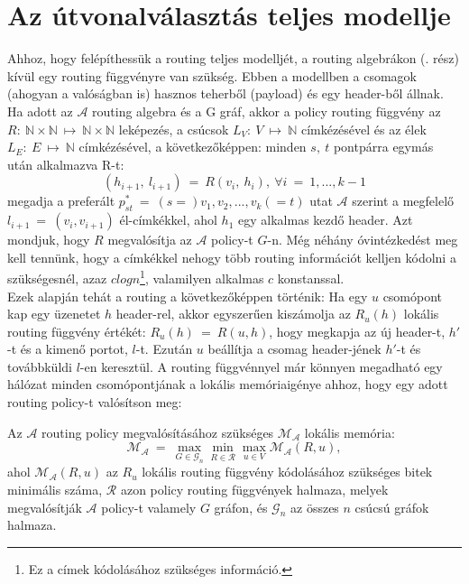   \section{Az útvonalválasztás teljes modellje }\label{routingmodell}
  Ahhoz, hogy felépíthessük a routing teljes modelljét, a routing algebrákon (. rész) kívül egy routing függvényre van szükség. Ebben a modellben a csomagok (ahogyan a valóságban is) hasznos teherből (payload) és egy header-ből állnak. Ha adott az $\mathcal{A}$ routing algebra és a G gráf, akkor a policy routing függvény az $R:~ \mathbb{N} \times \mathbb{N}~\mapsto~\mathbb{N} \times \mathbb{N}$ leképezés, a csúcsok $L_{V}:~V~\mapsto~\mathbb{N}$ címkézésével és az élek $L_{E}:~E~\mapsto~\mathbb{N}$ címkézésével, a következőképpen: minden $s,~t$ pontpárra egymás után alkalmazva R-t:
  $$(h_{i+1},~l_{i+1})~=~R(v_{i},~h_{i}),~\forall i~=~1, ..., k-1$$
  megadja a preferált $p_{st}^{*}~=~(s=) v_{1}, v_{2}, ..., v_{k}(=t)$ utat $\mathcal{A}$ szerint a megfelelő $l_{i+1}~=~(v_{i},v_{i+1})$ él-címkékkel, ahol $h_{1}$ egy alkalmas kezdő header. Azt mondjuk, hogy $R$ megvalósítja az $\mathcal{A}$ policy-t $G$-n. Még néhány óvintézkedést meg kell tennünk, hogy a címkékkel nehogy több routing információt kelljen kódolni a szükségesnél, azaz $c log n$\footnote{ Ez a címek kódolásához szükséges információ.}, valamilyen alkalmas $c$ konstanssal.\\

  Ezek alapján tehát a routing a következőképpen történik: Ha egy $u$ csomópont kap egy üzenetet $h$ header-rel, akkor egyszerűen kiszámolja az $R_{u}(h)$ lokális routing függvény értékét: $R_{u}(h)~=~R(u,h)$, hogy megkapja az új header-t, $h'$-t és a kimenő portot, $l$-t. Ezután $u$ beállítja a csomag header-jének $h'$-t és továbbküldi $l$-en keresztül.
  A routing függvénnyel már könnyen megadható egy hálózat minden csomópontjának a lokális memóriaigénye ahhoz, hogy egy adott routing policy-t valósítson meg:
  \begin{definition} 
    Az $\mathcal{A}$ routing policy megvalósításához szükséges $\mathcal{M_{\mathcal{A}}}$ lokális memória: $$\mathcal{M_{\mathcal{A}}}~=~\max_{G \in \mathcal{G}_{n}}{ \min_{R \in \mathcal{R}}{\max_{u \in V}{ \mathcal{M_{\mathcal{A}}}(R,u)}}},$$ ahol $\mathcal{M_{\mathcal{A}}}(R,u)$ az $R_{u}$ lokális routing függvény kódolásához szükséges bitek minimális száma, $\mathcal{R}$ azon policy routing függvények halmaza, melyek megvalósítják $\mathcal{A}$ policy-t valamely $G$ gráfon, és $\mathcal{G}_{n}$ az összes $n$ csúcsú gráfok halmaza.
  \end{definition}

